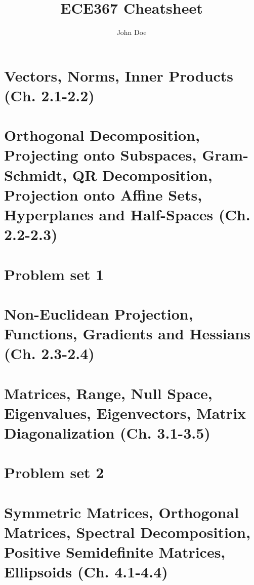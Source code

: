 \documentclass{article}
\title{ECE367 Cheatsheet}
\author{John Doe}
\begin{document}
\maketitle

\tableofcontents

\listoffigures

\listoftables

\section{Vectors, Norms, Inner Products (Ch. 2.1-2.2)}

\newpage

\section{Orthogonal Decomposition, Projecting onto Subspaces, Gram-Schmidt, QR Decomposition, Projection onto Affine Sets, Hyperplanes and Half-Spaces (Ch. 2.2-2.3)}

\newpage

\section{Problem set 1}

\newpage

\section{Non-Euclidean Projection, Functions, Gradients and Hessians (Ch. 2.3-2.4)}

\newpage

\section{Matrices, Range, Null Space, Eigenvalues, Eigenvectors, Matrix Diagonalization (Ch. 3.1-3.5)}

\newpage

\section{Problem set 2}

\newpage

\section{Symmetric Matrices, Orthogonal Matrices, Spectral Decomposition, Positive Semidefinite Matrices, Ellipsoids (Ch. 4.1-4.4)}

\newpage
\end{document}
